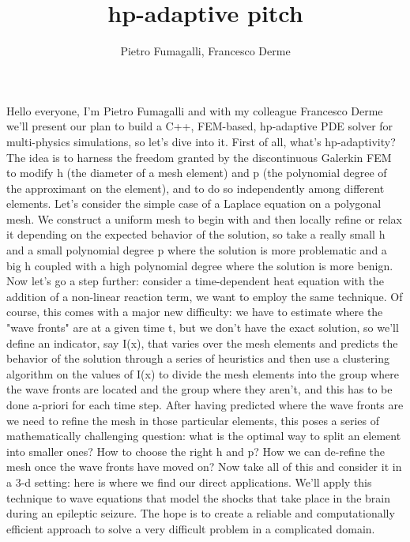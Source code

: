 \documentclass{article}
\title{hp-adaptive pitch}
\author{Pietro Fumagalli, Francesco Derme}
\begin{document}
\maketitle
\noindent
Hello everyone, I'm Pietro Fumagalli and with my colleague Francesco Derme we'll present our plan to build a C++,
FEM-based, hp-adaptive PDE solver for multi-physics simulations, so let's dive into it. First of all, what's hp-adaptivity? 
The idea is to harness the freedom granted by the discontinuous Galerkin FEM to modify h (the diameter of a mesh element) and p
(the polynomial degree of the approximant on the element), and to do so independently among different elements.
\newline
\newline
Let's consider the simple case of a Laplace equation on a polygonal mesh. We construct a uniform mesh to begin with and then
locally refine or relax it depending on the expected behavior of the solution, so take a really small h and a small polynomial 
degree p where the solution is more problematic and a big h coupled with a high polynomial degree where the solution is more benign.
\newline
\newline
Now let's go a step further: consider a time-dependent heat equation with the addition of a non-linear reaction term, we want to employ
the same technique. Of course, this comes with a major new difficulty: we have to estimate where the "wave fronts" are at a given time t,
but we don't have the exact solution, so we'll define an indicator, say I(x), that varies over the mesh elements and predicts the behavior
of the solution through a series of heuristics and then use a clustering algorithm on the values of I(x) to divide the mesh elements into 
the group where the wave fronts are located and the group where they aren't, and this has to be done a-priori for each time step. After
having predicted where the wave fronts are we need to refine the mesh in those particular elements, this poses a series of mathematically
challenging question: what is the optimal way to split an element into smaller ones? How to choose the right h and p? How we can de-refine
the mesh once the wave fronts have moved on?
\newline
\newline
Now take all of this and consider it in a 3-d setting: here is where we find our direct applications. We'll apply this technique to wave
equations that model the shocks that take place in the brain during an epileptic seizure. The hope is to create a reliable and computationally
efficient approach to solve a very difficult problem in a complicated domain. 
\end{document}
